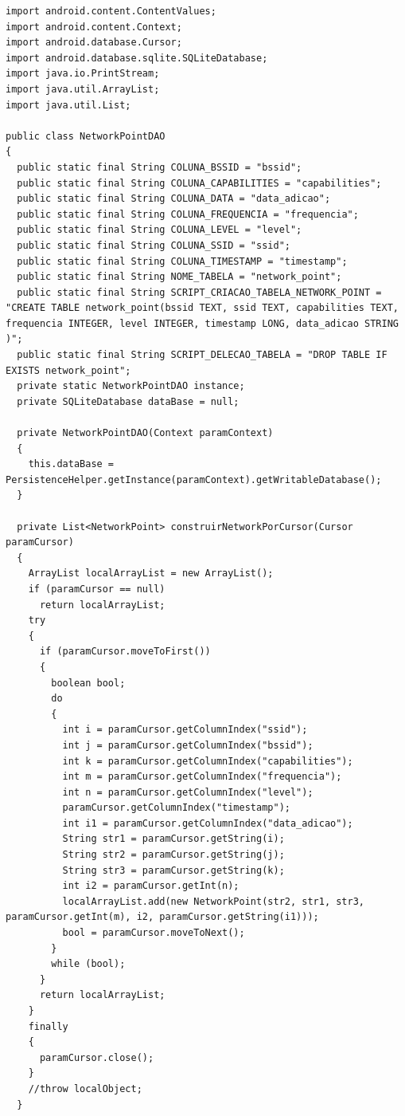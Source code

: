 \documentclass[12pt, %
openright, 
oneside,
a4paper,
brazil]{facom-ufu-abntex2}
\begin{document}
\begin{anexosenv}
\begin{lstlisting}
import android.content.ContentValues;
import android.content.Context;
import android.database.Cursor;
import android.database.sqlite.SQLiteDatabase;
import java.io.PrintStream;
import java.util.ArrayList;
import java.util.List;

public class NetworkPointDAO
{
  public static final String COLUNA_BSSID = "bssid";
  public static final String COLUNA_CAPABILITIES = "capabilities";
  public static final String COLUNA_DATA = "data_adicao";
  public static final String COLUNA_FREQUENCIA = "frequencia";
  public static final String COLUNA_LEVEL = "level";
  public static final String COLUNA_SSID = "ssid";
  public static final String COLUNA_TIMESTAMP = "timestamp";
  public static final String NOME_TABELA = "network_point";
  public static final String SCRIPT_CRIACAO_TABELA_NETWORK_POINT = "CREATE TABLE network_point(bssid TEXT, ssid TEXT, capabilities TEXT, frequencia INTEGER, level INTEGER, timestamp LONG, data_adicao STRING )";
  public static final String SCRIPT_DELECAO_TABELA = "DROP TABLE IF EXISTS network_point";
  private static NetworkPointDAO instance;
  private SQLiteDatabase dataBase = null;

  private NetworkPointDAO(Context paramContext)
  {
    this.dataBase = PersistenceHelper.getInstance(paramContext).getWritableDatabase();
  }

  private List<NetworkPoint> construirNetworkPorCursor(Cursor paramCursor)
  {
    ArrayList localArrayList = new ArrayList();
    if (paramCursor == null)
      return localArrayList;
    try
    {
      if (paramCursor.moveToFirst())
      {
        boolean bool;
        do
        {
          int i = paramCursor.getColumnIndex("ssid");
          int j = paramCursor.getColumnIndex("bssid");
          int k = paramCursor.getColumnIndex("capabilities");
          int m = paramCursor.getColumnIndex("frequencia");
          int n = paramCursor.getColumnIndex("level");
          paramCursor.getColumnIndex("timestamp");
          int i1 = paramCursor.getColumnIndex("data_adicao");
          String str1 = paramCursor.getString(i);
          String str2 = paramCursor.getString(j);
          String str3 = paramCursor.getString(k);
          int i2 = paramCursor.getInt(n);
          localArrayList.add(new NetworkPoint(str2, str1, str3, paramCursor.getInt(m), i2, paramCursor.getString(i1)));
          bool = paramCursor.moveToNext();
        }
        while (bool);
      }
      return localArrayList;
    }
    finally
    {
      paramCursor.close();
    }
    //throw localObject;
  }


\end{lstlisting}
\end{anexosenv}
\end{document}
